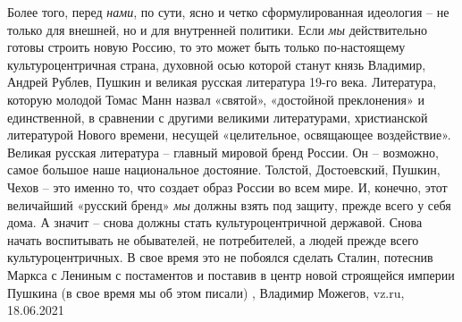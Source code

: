 Более того, перед \emph{нами}, по сути, ясно и четко сформулированная идеология – не
только для внешней, но и для внутренней политики. Если \emph{мы} действительно готовы
строить новую Россию, то это может быть только по-настоящему культуроцентричная
страна, духовной осью которой станут князь Владимир, Андрей Рублев, Пушкин и
великая русская литература 19-го века. Литература, которую молодой Томас Манн
назвал «святой», «достойной преклонения» и единственной, в сравнении с другими
великими литературами, христианской литературой Нового времени, несущей
«целительное, освящающее воздействие».  Великая русская литература – главный
мировой бренд России. Он – возможно, самое большое наше национальное достояние.
Толстой, Достоевский, Пушкин, Чехов – это именно то, что создает образ России
во всем мире. И, конечно, этот величайший «русский бренд» \emph{мы} должны взять под
защиту, прежде всего у себя дома. А значит – снова должны стать
культуроцентричной державой. Снова начать воспитывать не обывателей, не
потребителей, а людей прежде всего культуроцентричных. В свое время это не
побоялся сделать Сталин, потеснив Маркса с Лениным с постаментов и поставив в
центр новой строящейся империи Пушкина (в свое время мы об этом писали)
, 
Владимир Можегов, vz.ru, 18.06.2021
